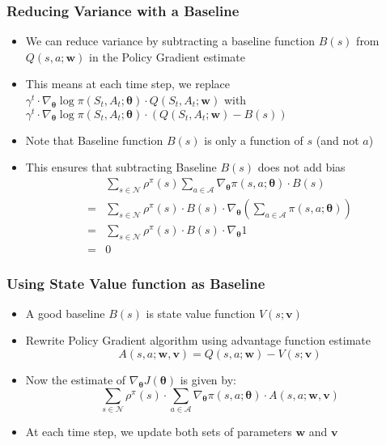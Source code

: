 \documentclass[handout]{beamer}
\begin{document}
\begin{frame}
\frametitle{Reducing Variance with a Baseline}
\pause
\begin{itemize}[<+->]
\item We can reduce variance by subtracting a baseline function $B(s)$ from $Q(s,a;\bm{w})$ in the Policy Gradient estimate
\item This means at each time step, we replace $\gamma^t \cdot \nabla_{\bm{\theta}} \log \pi(S_t,A_t; \bm{\theta}) \cdot Q(S_t,A_t; \bm{w})$ with $\gamma^t \cdot \nabla_{\bm{\theta}} \log \pi(S_t,A_t; \bm{\theta}) \cdot (Q(S_t,A_t; \bm{w}) - B(s))$
\item Note that Baseline function $B(s)$ is only a function of $s$ (and not $a$)
\item This ensures that subtracting Baseline $B(s)$ does not add bias
\begin{align*}
& \sum_{s \in \mathcal{N}} \rho^{\pi}(s) \sum_{a \in \mathcal{A}} \nabla_{\bm{\theta}} \pi(s,a; \bm{\theta}) \cdot B(s)\\
 = & \sum_{s \in \mathcal{N}} \rho^{\pi}(s) \cdot B(s) \cdot \nabla_{\bm{\theta}} (\sum_{a \in \mathcal{A}} \pi(s,a; \bm{\theta})) \\
  = & \sum_{s \in \mathcal{N}} \rho^{\pi}(s) \cdot B(s) \cdot \nabla_{\bm{\theta}} 1 \\
  = & 0
\end{align*}
\end{itemize}
\end{frame}

\begin{frame}
\frametitle{Using State Value function as Baseline}
\pause
\begin{itemize}[<+->]
\item A good baseline $B(s)$ is state value function $V(s;\bm{v})$
\item Rewrite Policy Gradient algorithm using advantage function estimate
$$A(s,a;\bm{w},\bm{v}) = Q(s,a;\bm{w}) - V(s; \bm{v})$$
\item Now the estimate of $\nabla_{\bm{\theta}} J(\bm{\theta})$ is given by:
$$\sum_{s \in \mathcal{N}} \rho^{\pi}(s) \cdot \sum_{a \in \mathcal{A}} \nabla_{\bm{\theta}} \pi(s, a; \bm{\theta}) \cdot A(s,a; \bm{w}, \bm{v})$$
\item At each time step, we update both sets of parameters $\bm{w}$ and $\bm{v}$
\end{itemize}
\end{frame}
\end{document}
